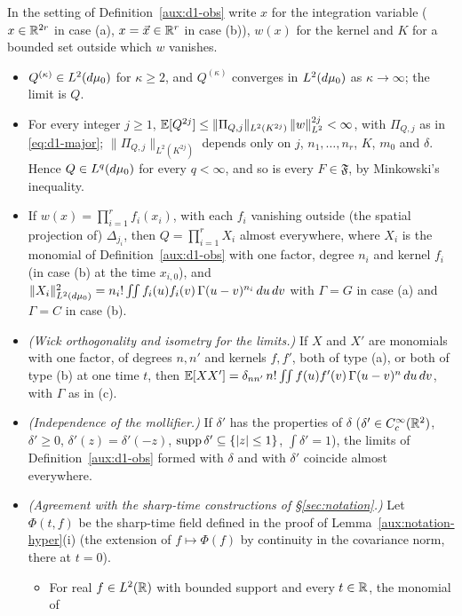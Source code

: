 \begin{auxlemma}\label{aux:d1-moments}
In the setting of Definition~\ref{aux:d1-obs} write $x$ for the integration variable ($x\in
\mathbb{R}^{2r}$ in case (a), $x=\vec x\in\mathbb{R}^r$ in case (b)), $w(x)$ for the kernel and $K$ for a
bounded set outside which $w$ vanishes.
\begin{itemize}
\item[(a)] $Q^{(\kappa)}\in L^2(d\mu_0)$ for $\kappa\ge2$, and $Q^{(\kappa)}$ converges in
$L^2(d\mu_0)$ as $\kappa\to\infty$; the limit is $Q$.
\item[(b)] For every integer $j\ge1$,
$\mathbb{E}[Q^{2j}]\le\|\Pi_{Q,j}\|_{L^2(K^{2j})}\,\|w\|_{L^2}^{2j}<\infty$, with $\Pi_{Q,j}$ as in
\eqref{eq:d1-major}; $\|\Pi_{Q,j}\|_{L^2(K^{2j})}$ depends only on $j$, $n_1,\dots,n_r$, $K$,
$m_0$ and $\delta$. Hence $Q\in L^q(d\mu_0)$ for every $q<\infty$, and so is every
$F\in\mathfrak F$, by Minkowski's inequality.
\item[(c)] If $w(x)=\prod_{i=1}^rf_i(x_i)$, with each $f_i$ vanishing outside (the spatial
projection of) $\Delta_{j_i}$, then $Q=\prod_{i=1}^rX_i$ almost everywhere, where $X_i$ is the
monomial of Definition~\ref{aux:d1-obs} with one factor, degree $n_i$ and kernel $f_i$ (in case
(b) at the time $x_{i,0}$), and
$\|X_i\|_{L^2(d\mu_0)}^2=n_i!\iint f_i(u)f_i(v)\,\Gamma(u-v)^{n_i}\,du\,dv$ with $\Gamma=G$ in
case (a) and $\Gamma=C$ in case (b).
\item[(d)] \emph{(Wick orthogonality and isometry for the limits.)} If $X$ and $X'$ are monomials
with one factor, of degrees $n,n'$ and kernels $f,f'$, both of type (a), or both of type (b) at
one time $t$, then $\mathbb{E}[XX']=\delta_{nn'}\,n!\iint f(u)f'(v)\,\Gamma(u-v)^n\,du\,dv$, with
$\Gamma$ as in (c).
\item[(e)] \emph{(Independence of the mollifier.)} If $\delta'$ has the properties of $\delta$
($\delta'\in C_c^\infty(\mathbb{R}^2)$, $\delta'\ge0$, $\delta'(z)=\delta'(-z)$,
$\operatorname{supp}\delta'\subseteq\{|z|\le1\}$, $\int\delta'=1$), the limits of
Definition~\ref{aux:d1-obs} formed with $\delta$ and with $\delta'$ coincide almost everywhere.
\item[(f)] \emph{(Agreement with the sharp-time constructions of \S\ref{sec:notation}.)} Let
$\Phi(t,f)$ be the sharp-time field defined in the proof of Lemma~\ref{aux:notation-hyper}(i)
(the extension of $f\mapsto\Phi(f)$ by continuity in the covariance norm, there at $t=0$).
\begin{itemize}
\item[(1)] For real $f\in L^2(\mathbb{R})$ with bounded support and every $t\in\mathbb{R}$, the monomial of

\end{itemize}
\end{itemize}
\end{auxlemma}
